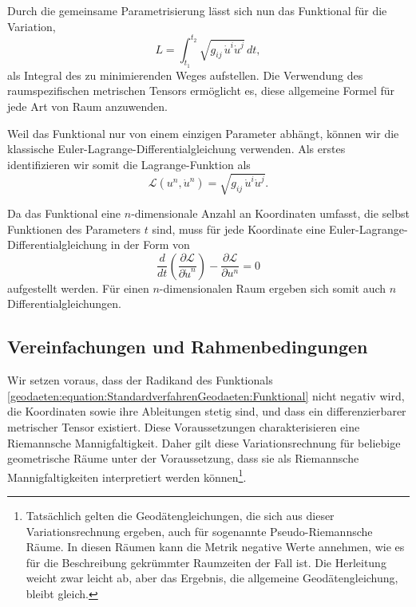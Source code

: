 Durch die gemeinsame Parametrisierung lässt sich nun das Funktional für die Variation,
\begin{equation}
	L = \int_{t_1}^{t_2} \sqrt{g_{ij} \, \dot{u}^i \dot{u}^j} \, dt,
	\label{geodaeten:equation:StandardverfahrenGeodaeten:Funktional}
\end{equation}
als Integral des zu minimierenden Weges aufstellen.
Die Verwendung des raumspezifischen metrischen Tensors ermöglicht es, diese allgemeine Formel für jede Art von Raum anzuwenden.

Weil das Funktional nur von einem einzigen Parameter abhängt, können wir die klassische Euler-Lagrange-Differentialgleichung verwenden.
Als erstes identifizieren wir somit die Lagrange-Funktion als
\begin{equation}
	\mathcal{L}(u^n, \dot{u}^n) = \sqrt{g_{ij} \, \dot{u}^i \dot{u}^j}.
	\label{geodaeten:equation:StandardverfahrenGeodaeten:LagrangeFunktion}
\end{equation}

Da das Funktional eine $n$-dimensionale Anzahl an Koordinaten umfasst, die selbst Funktionen des Parameters $t$ sind, muss für jede Koordinate eine Euler-Lagrange-Differentialgleichung in der Form von
\begin{equation}
	\frac{d}{dt} \left(\frac{\partial \mathcal{L}}{\partial \dot{u}^n}\right) - \frac{\partial \mathcal{L}}{\partial u^n} = 0
	\label{geodaeten:equation:StandardverfahrenGeodaeten:DGL1}
\end{equation}
aufgestellt werden.
Für einen $n$-dimensionalen Raum ergeben sich somit auch $n$ Differentialgleichungen. 

\subsection{Vereinfachungen und Rahmenbedingungen}
Wir setzen voraus, dass der Radikand des Funktionals \eqref{geodaeten:equation:StandardverfahrenGeodaeten:Funktional} nicht negativ wird, die Koordinaten sowie ihre Ableitungen stetig sind, und dass ein differenzierbarer metrischer Tensor existiert. 
Diese Voraussetzungen charakterisieren eine Riemannsche Mannigfaltigkeit.
Daher gilt diese Variationsrechnung für beliebige geometrische Räume unter der Voraussetzung, dass sie als Riemannsche Mannigfaltigkeiten interpretiert werden können\footnote{Tatsächlich gelten die Geodätengleichungen, die sich aus dieser Variationsrechnung ergeben, auch für sogenannte Pseudo-Riemannsche Räume.
	In diesen Räumen kann die Metrik negative Werte annehmen, wie es für die Beschreibung gekrümmter Raumzeiten der Fall ist.
	Die Herleitung weicht zwar leicht ab, aber das Ergebnis, die allgemeine Geodätengleichung, bleibt gleich.
}.

